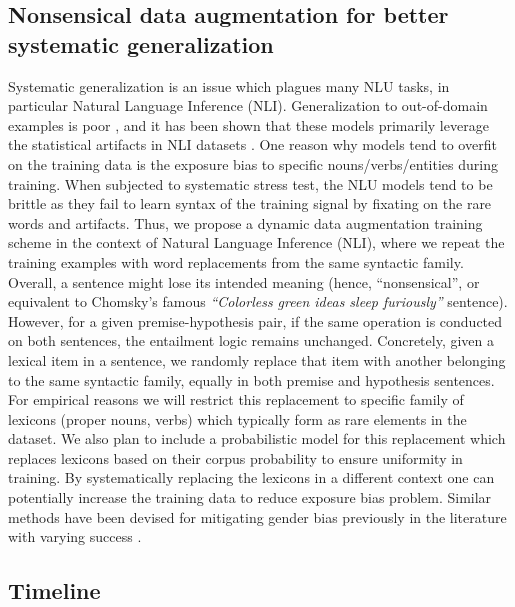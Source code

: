 \documentclass[12pt]{article}
\begin{document}

\subsection{Nonsensical data augmentation for better systematic generalization}

Systematic generalization is an issue which plagues many NLU tasks, in particular Natural Language Inference (NLI). Generalization to out-of-domain examples is poor \cite{nie2020}, and it has been shown that these models primarily leverage the statistical artifacts in NLI datasets \cite{gururangan2018a,poliak-etal-2018-hypothesis,tsuchiya-2018-performance}. One reason why models tend to overfit on the training data is the exposure bias to specific nouns/verbs/entities during training. When subjected to systematic stress test, the NLU models tend to be brittle as they fail to learn syntax of the training signal by fixating on the rare words and artifacts. Thus, we propose a dynamic data augmentation training scheme in the context of Natural Language Inference (NLI), where we repeat the training examples with word replacements from the same syntactic family. Overall, a sentence might lose its intended meaning (hence, ``nonsensical'', or equivalent to Chomsky's famous \textit{``Colorless green ideas sleep furiously''} sentence). However, for a given premise-hypothesis pair, if the same operation is conducted on both sentences, the entailment logic remains unchanged. Concretely, given a lexical item in a sentence, we randomly replace that item with another belonging to the same syntactic family, equally in both premise and hypothesis sentences. For empirical reasons we will restrict this replacement to specific family of lexicons (proper nouns, verbs) which typically form as rare elements in the dataset. We also plan to include a probabilistic model for this replacement which replaces lexicons based on their corpus probability to ensure uniformity in training. By systematically replacing the lexicons in a different context one can potentially increase the training data to reduce exposure bias problem. Similar methods have been devised for mitigating gender bias previously in the literature with varying success \cite{maudslay2020b}.

\subsection{Timeline}
\end{document}
